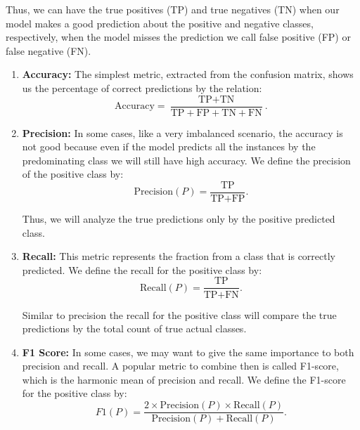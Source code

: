	Thus, we can have the true positives (TP) and true negatives (TN) when our model makes a good prediction about the positive and negative classes, respectively, when the model misses the prediction we call false positive (FP) or false negative (FN).

	\begin{enumerate}
		\item \textbf{Accuracy:} The simplest metric, extracted from the confusion matrix, shows us the percentage of correct predictions by the relation:
		\begin{equation}
			\text{Accuracy} = \frac{\text{TP} + \text{TN}}{\text{TP} + \text{FP} + \text{TN} + \text{FN}} \text{.}
		\end{equation}

		\item \textbf{Precision:} In some cases, like a very imbalanced scenario, the accuracy is not good because even if the model predicts all the instances by the predominating class we will still have high accuracy. We define the precision of the positive class by:
		\begin{equation}
			\text{Precision}(P) = \frac{\text{TP}}{\text{TP} + \text{FP}} \text{.}
		\end{equation}

		Thus, we will analyze the true predictions only by the positive predicted class.

		\item \textbf{Recall:} This metric represents the fraction from a class that is correctly predicted. We define the recall for the positive class by:
		\begin{equation}
			\text{Recall}(P) = \frac{\text{TP}}{\text{TP} + \text{FN}} \text{.}
		\end{equation}

		Similar to precision the recall for the positive class will compare the true predictions by the total count of true actual classes.

		\item \textbf{F1 Score:} In some cases, we may want to give the same importance to both precision and recall. A popular metric to combine then is called F1-score, which is the harmonic mean of precision and recall. We define the F1-score for the positive class by:
		\begin{equation}
			F1(P) = \frac{2 \times \text{Precision}(P) \times \text{Recall}(P)}{\text{Precision}(P) + \text{Recall}(P)} \text{.}
		\end{equation}

	\end{enumerate}


